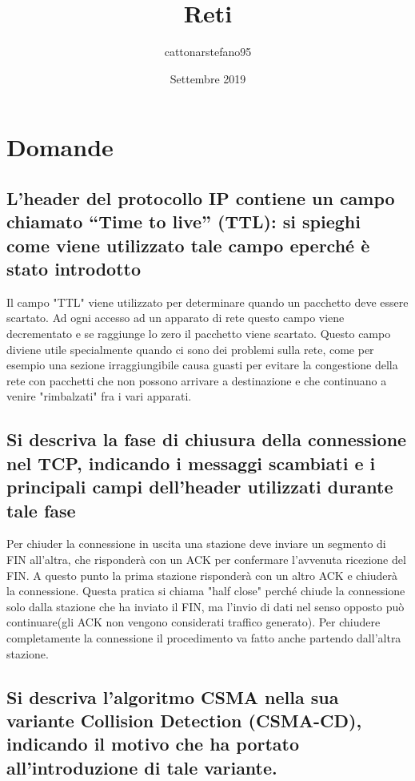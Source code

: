 \documentclass{article}
\title{Reti}
\author{cattonarstefano95 }
\date{Settembre 2019}
\begin{document}
\maketitle

\section{Domande}
    \subsection*  {L’header del protocollo IP contiene un campo chiamato “Time to live” (TTL): si spieghi come viene utilizzato tale campo eperché è stato introdotto}
    Il campo "TTL" viene utilizzato per determinare quando un pacchetto deve essere scartato.
    Ad ogni accesso ad un apparato di rete questo campo viene decrementato e se raggiunge lo zero il pacchetto viene scartato. Questo campo diviene utile specialmente quando ci sono dei problemi sulla rete,
    come per esempio una sezione irraggiungibile causa guasti per evitare la congestione della rete con pacchetti che non possono arrivare a destinazione e che continuano a venire "rimbalzati" fra i vari apparati.
    
    \subsection*{Si descriva la fase di chiusura della connessione nel TCP, indicando i messaggi scambiati e i principali campi dell’header utilizzati durante tale fase}
    
    Per chiuder la connessione in uscita una stazione deve inviare un segmento di FIN all'altra, che risponderà con un ACK per confermare l'avvenuta ricezione del FIN. A questo punto la prima stazione risponderà con un altro ACK e chiuderà la connessione. Questa pratica si chiama "half close" perché chiude la connessione solo dalla stazione che ha inviato il FIN, ma l'invio di dati nel senso opposto può continuare(gli ACK non vengono considerati traffico generato). Per chiudere completamente la connessione il procedimento va fatto anche partendo dall'altra stazione.
    
    \subsection*{Si descriva l’algoritmo CSMA nella sua variante Collision Detection (CSMA-CD), indicando il motivo che ha portato all’introduzione di tale variante.}
    
\end{document}

